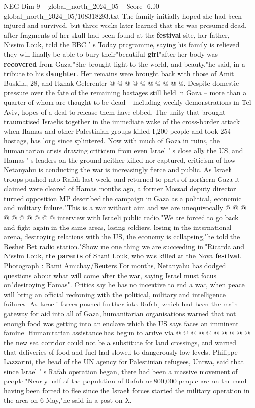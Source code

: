 \begin{textsample}{NEG Dim 9 – global\_north\_2024\_05 – Score -6.00 – global\_north\_2024\_05/108318293.txt}
The family initially hoped she had been injured and survived, but three weeks later learned that she was presumed dead, after fragments of her skull had been found at the \textbf{festival} site, her father, Nissim Louk, told the BBC ' s Today programme, saying his family is relieved they will finally be able to bury their"beautiful \textbf{girl}"after her body was \textbf{recovered} from Gaza."She brought light to the world, and beauty,"he said, in a tribute to his \textbf{daughter}.
Her remains were brought back with those of Amit Buskila, 28, and Itzhak Gelerenter @ @ @ @ @ @ @ @ @ @.
Despite domestic pressure over the fate of the remaining hostages still held in Gaza -- more than a quarter of whom are thought to be dead -- including weekly demonstrations in Tel Aviv, hopes of a deal to release them have ebbed.
The unity that brought traumatised Israelis together in the immediate wake of the cross-border attack when Hamas and other Palestinian groups killed 1,200 people and took 254 hostage, has long since splintered.
Now with much of Gaza in ruins, the humanitarian crisis drawing criticism from even Israel ' s close ally the US, and Hamas ' s leaders on the ground neither killed nor captured, criticism of how Netanyahu is conducting the war is increasingly fierce and public.
As Israeli troops pushed into Rafah last week, and returned to parts of northern Gaza it claimed were cleared of Hamas months ago, a former Mossad deputy director turned opposition MP described the campaign in Gaza as a political, economic and military failure."This is a war without aim and we are unequivocally @ @ @ @ @ @ @ @ @ @ interview with Israeli public radio."We are forced to go back and fight again in the same areas, losing soldiers, losing in the international arena, destroying relations with the US, the economy is collapsing,"he told the Reshet Bet radio station."Show me one thing we are succeeding in."Ricarda and Nissim Louk, the \textbf{parents} of Shani Louk, who was killed at the Nova \textbf{festival}.
Photograph : Rami Amichay/Reuters For months, Netanyahu has dodged questions about what will come after the war, saying Israel must focus on"destroying Hamas".
Critics say he has no incentive to end a war, when peace will bring an official reckoning with the political, military and intelligence failures.
As Israeli forces pushed further into Rafah, which had been the main gateway for aid into all of Gaza, humanitarian organisations warned that not enough food was getting into an enclave which the US says faces an imminent famine.
Humanitarian assistance has begun to arrive via @ @ @ @ @ @ @ @ @ @ the new sea corridor could not be a substitute for land crossings, and warned that deliveries of food and fuel had slowed to dangerously low levels.
Philippe Lazzarini, the head of the UN agency for Palestinian refugees, Unrwa, said that since Israel ' s Rafah operation began, there had been a massive movement of people."Nearly half of the population of Rafah or 800,000 people are on the road having been forced to flee since the Israeli forces started the military operation in the area on 6 May,"he said in a post on X.

\end{textsample}
